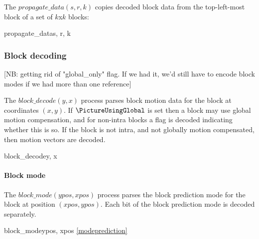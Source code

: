 The $propagate\_data(s, r, k)$ copies decoded block data from the top-left-most block
of a set of $k$x$k$ blocks:

\begin{pseudo}{propagate\_data}{s, r, k}
        \bsCODE{\BlockData[j][i]=\BlockData[s][r]}
    \bsEND
\bsEND
\end{pseudo}

\subsubsection{Block decoding}
\label{blockdecoding}

[NB: getting rid of "global\_only" flag. If we had it, we'd still have to encode block modes if we had more than one reference]

The $block\_decode(y, x)$ process parses block motion data for the block at coordinates $(x, y)$. If $\PictureUsingGlobal$ is set
then a block may use global motion compensation, and for non-intra blocks a flag is decoded indicating whether this is so. If
the block is not intra, and not globally motion compensated, then motion vectors are decoded.

\begin{pseudo}{block\_decode}{y, x}
\bsIF{\BlockData[y][x][mode]==\Intra}
    \bsCODE{\BlockData[y][x][global]=\false}
\bsELSE
    \bsIF{\PictureUsingGlobal==\true}
    \bsELSE
        \bsCODE{\BlockData[y][x][global]=\false}
    \bsEND

    \bsIF{\BlockData[y][x][global]=\false}
    \bsEND
\end{pseudo}

\paragraph{Block mode \\}
\label{blockmode}

The $block\_mode(ypos,xpos)$ process parses the block prediction mode for the block at position $(xpos, ypos)$. Each
bit of the block prediction mode is decoded separately.

\begin{pseudo}{block\_mode}{ypos, xpos}
     {\ref{modeprediction}}
\bsEND
\end{pseudo}

